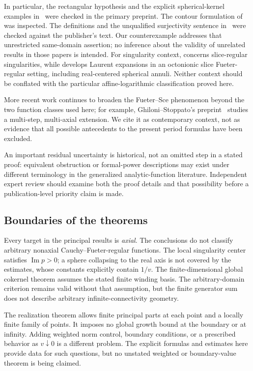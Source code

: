 \documentclass[11pt,a4paper]{article}
\numberwithin{equation}{section}
\theoremstyle{definition}
\theoremstyle{remark}
\newcommand{\Ima}{\operatorname{Im}}
\begin{document}
In particular, the rectangular hypothesis and the explicit spherical-kernel
examples in~\cite{CPSS} were checked in the primary preprint. The contour
formulation of~\cite[Theorem~3.6]{DQ} was inspected. The definitions and the
unqualified surjectivity sentence in~\cite[\S4, p.~2539]{KP} were checked
against the publisher's text. Our counterexample addresses that unrestricted
same-domain assertion; no inference about the validity of unrelated results
in those papers is intended. For singularity context,
\cite{GPS} concerns slice-regular singularities, while
\cite[\S2.5]{Ghiloni} develops Laurent expansions in an octonionic slice
Fueter-regular setting, including real-centered spherical annuli. Neither
context should be conflated with the particular affine-logarithmic
classification proved here.

More recent work continues to broaden the Fueter--Sce phenomenon beyond
the two function classes used here; for example, Ghiloni--Stoppato's
preprint~\cite{GSrecent} studies a multi-step, multi-axial extension.
We cite it as contemporary context, not as evidence that all possible
antecedents to the present period formulas have been excluded.

An important residual uncertainty is historical, not an omitted step in a
stated proof: equivalent obstruction or formal-power descriptions may exist
under different terminology in the generalized analytic-function literature.
Independent expert review should examine both the proof details and that
possibility before a publication-level priority claim is made.

\subsection{Boundaries of the theorems}
Every target in the principal results is \emph{axial}. The conclusions do
not classify arbitrary nonaxial Cauchy--Fueter-regular functions. The local
singularity center satisfies $\Ima p>0$; a sphere collapsing to the real
axis is not covered by the estimates, whose constants explicitly contain
$1/v$. The finite-dimensional global cokernel theorem assumes the stated
finite winding basis. The arbitrary-domain criterion remains valid without
that assumption, but the finite generator sum does not describe arbitrary
infinite-connectivity geometry.

The realization theorem allows finite principal parts at each point and a
locally finite family of points. It imposes no global growth bound at the
boundary or at infinity. Adding weighted norm control, boundary conditions,
or a prescribed behavior as $v\downarrow0$ is a different problem. The
explicit formulas and estimates here provide data for such questions, but
no unstated weighted or boundary-value theorem is being claimed.
\end{document}
